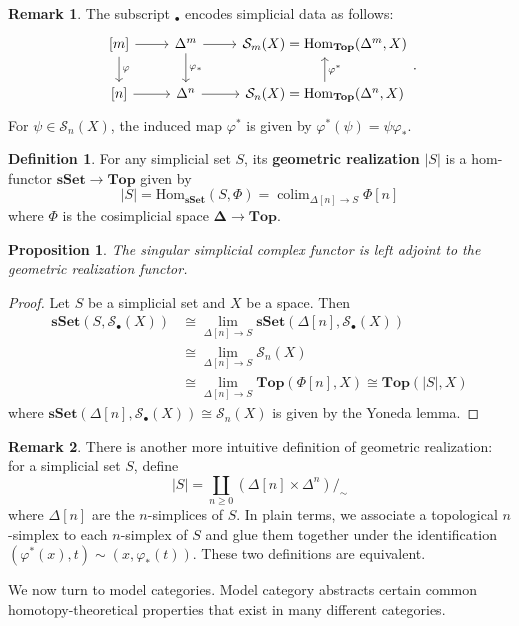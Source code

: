 \documentclass[psamsfonts]{amsart}
\newtheorem{prop}{Proposition}[section]
\theoremstyle{definition}
\newtheorem{defn}{Definition}[section]
\newtheorem{rem}{Remark}[section]
\newcommand{\Top}{\mathbf{Top}}
\newcommand{\sSet}{\mathbf{sSet}}
\newcommand{\Hom}{\mathrm{Hom}}
\DeclareMathOperator{\colim}{colim}
\numberwithin{equation}{section}
\begin{document}
\begin{rem}
The subscript $_\bullet$ encodes simplicial data as follows:
\[\begin{tikzcd}
{[m]}\arrow[d,"\varphi"]\arrow[r]&\Delta^m\arrow[r]\arrow[d,"\varphi_\ast"]&\mathcal{S}_m(X)=\Hom_{\Top}(\Delta^m,X)\\
{[n]}\arrow[r]&\Delta^n\arrow[r]&\mathcal{S}_n(X)=\Hom_{\Top}(\Delta^n,X)\arrow[u,"\varphi^\ast"']
\end{tikzcd}.\]
For $\psi\in\mathcal{S}_n(X)$, the induced map $\varphi^\ast$ is given by $\varphi^\ast(\psi)=\psi\varphi_\ast$.
\end{rem}

\begin{defn}
For any simplicial set $S$, its \textbf{geometric realization} $|S|$ is a hom-functor $\sSet\to\Top$ given by
\[|S|=\Hom_\sSet(S,\Phi)=\colim_{\Delta[n]\to S}\Phi[n]\]
where $\Phi$ is the cosimplicial space $\mathbf{\Delta}\to\Top$.
\end{defn}

\begin{prop}
The singular simplicial complex functor is left adjoint to the geometric realization functor.
\end{prop}
\begin{proof}
Let $S$ be a simplicial set and $X$ be a space. Then
\begin{align*}
\sSet(S,\mathcal{S}_\bullet(X))&\cong\textstyle{\lim_{\Delta[n]\to S}\sSet(\Delta[n],\mathcal{S}_\bullet(X))}\\
&\cong\textstyle{\lim_{\Delta[n]\to S}\mathcal{S}_n(X)}\\
&\cong\textstyle{\lim_{\Delta[n]\to S}\Top(\Phi[n],X)}\cong\Top(|S|,X)
\end{align*}
where $\sSet(\Delta[n],\mathcal{S}_\bullet(X))\cong\mathcal{S}_n(X)$ is given by the Yoneda lemma.
\end{proof}

\begin{rem}
There is another more intuitive definition of geometric realization: for a simplicial set $S$, define
\[|S|=\coprod_{n\geq0}(\Delta[n]\times\Delta^n)/_{\sim}\]
where $\Delta[n]$ are the $n$-simplices of $S$. In plain terms, we associate a topological $n$-simplex to each $n$-simplex of $S$ and glue them together under the identification $(\varphi^\ast(x),t)\sim(x,\varphi_\ast(t))$. These two definitions are equivalent.
\end{rem}

We now turn to model categories. Model category abstracts certain common homotopy-theoretical properties that exist in many different categories.
\end{document}
